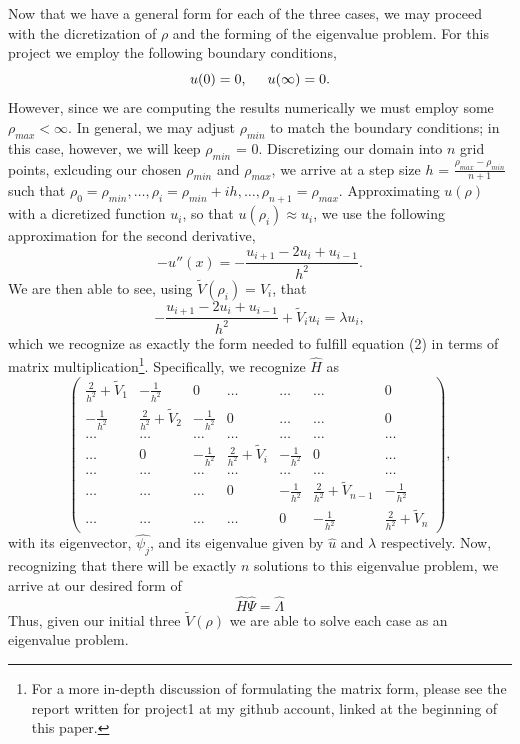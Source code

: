 \documentclass[11pt,a4paper]{article}
\begin{document}
{Now that we have a general form for each of the three cases, we may proceed with the dicretization of $\rho$ and the forming of the eigenvalue problem. For this project we employ the following boundary conditions,
\begin{equation}
u(0) = 0, \hspace{0.5 cm} u(\infty) = 0.
\end{equation}
However, since we are computing the results numerically we must employ some $\rho_{max} < \infty$. In general, we may adjust $\rho_{min}$ to match the boundary conditions; in this case, however, we will keep $\rho_{min}$ = 0. Discretizing our domain into $n$ grid points, exlcuding our chosen $\rho_{min}$ and $\rho_{max}$, we arrive at a step size $h$ = $\frac{\rho_{max} - \rho_{min}}{n+1}$ such that $\rho_0 = \rho_{min}, \dots , \rho_i = \rho_{min} + ih, \dots, \rho_{n+1} = \rho_{max}$. Approximating $u(\rho)$ with a dicretized function $u_i$, so that $u(\rho_i) \approx u_i$, we use the following approximation for the second derivative,
\begin{equation}
-u''(x) = -\frac{u_{i+1} - 2u_i + u_{i-1}}{h^2}.
\end{equation}
We are then able to see, using $\tilde{V}(\rho_i) = V_i$, that
\begin{equation}
-\frac{u_{i+1} - 2u_i + u_{i-1}}{h^2} + \tilde{V}_iu_i = \lambda u_i, 
\end{equation}
which we recognize as exactly the form needed to fulfill equation (2) in terms of matrix multiplication\footnote{For a more in-depth discussion of formulating the matrix form, please see the report written for project1 at my github account, linked at the beginning of this paper.}. Specifically, we recognize $\hat{H}$ as 
\begin{equation}
\left(\begin{array}{ccccccc}
			    \frac{2}{h^2} + \tilde{V}_1 & -\frac{1}{h^2} & 0 & \dots & \dots & \dots & 0 \\
			    -\frac{1}{h^2} & \frac{2}{h^2} + \tilde{V}_2 & -\frac{1}{h^2} & 0 & \dots & \dots & 0 \\
			    \dots & \dots & \dots & \dots & \dots & \dots & \dots \\
				\dots & 0 & -\frac{1}{h^2} & \frac{2}{h^2} + \tilde{V}_i & -\frac{1}{h^2} & 0 & \dots \\
			    \dots & \dots & \dots & \dots & \dots & \dots & \dots \\
			    \dots & \dots & \dots & 0 & -\frac{1}{h^2} & \frac{2}{h^2} + \tilde{V}_{n-1} & -\frac{1}{h^2} \\
                \dots & \dots & \dots & \dots & 0 & -\frac{1}{h^2} & \frac{2}{h^2} + \tilde{V}_n \end{array} \right),
\end{equation}
with its eigenvector, $\hat{\psi_j}$, and its eigenvalue given by $\hat{u}$ and $\lambda$ respectively. Now, recognizing that there will be exactly $n$ solutions to this eigenvalue problem, we arrive at our desired form of 
\begin{equation}
\hat{H}\hat{\Psi} = \hat{\Lambda}
\end{equation}
Thus, given our initial three $\tilde{V}(\rho)$ we are able to solve each case as an eigenvalue problem.

}
\end{document}
